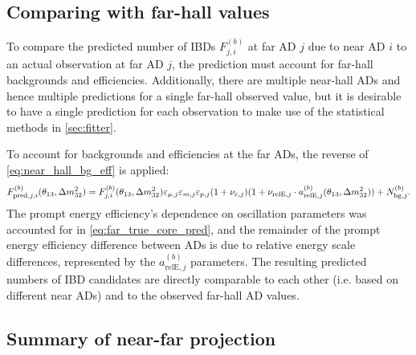 \subsection{Comparing with far-hall values}
\label{subsec:far_bg_eff}

To compare the predicted number of IBDs $F_{j,i}^{(b)}$
at far AD $j$ due to near AD $i$
to an actual observation at far AD $j$,
the prediction must account for far-hall backgrounds and efficiencies.
Additionally, there are multiple near-hall ADs
and hence multiple predictions for a single far-hall observed value,
but it is desirable to have a single prediction for each observation
to make use of the statistical methods in \cref{sec:fitter}.

To account for backgrounds and efficiencies at the far ADs,
the reverse of \cref{eq:near_hall_bg_eff} is applied:
\begin{equation}\label{eq:far_hall_bg_eff}
    F_{\text{pred},j,i}^{(b)}(\theta_{13},\Delta m^2_{32}) = F_{j,i}^{(b)}(\theta_{13},\Delta m^2_{32})
        \varepsilon_{\mu,j}\varepsilon_{m,j}\varepsilon_{p,j}
        (1 + \nu_{\varepsilon,j})
        (1 + \nu_{\text{relE},j}\cdot a_{\text{relE},j}^{(b)}(\theta_{13},\Delta m^2_{32}))
    + N_{\text{bg},j}^{(b)}.
\end{equation}
The prompt energy efficiency's dependence on oscillation parameters
was accounted for in \cref{eq:far_true_core_pred},
and the remainder of the prompt energy efficiency difference between ADs
is due to relative energy scale differences,
represented by the $a_{\text{relE},j}^{(b)}$ parameters.
The resulting predicted numbers of IBD candidates
are directly comparable to each other (i.e. based on different near ADs)
and to the observed far-hall AD values.

\subsection{Summary of near-far projection}
\label{subsec:model_summary}

